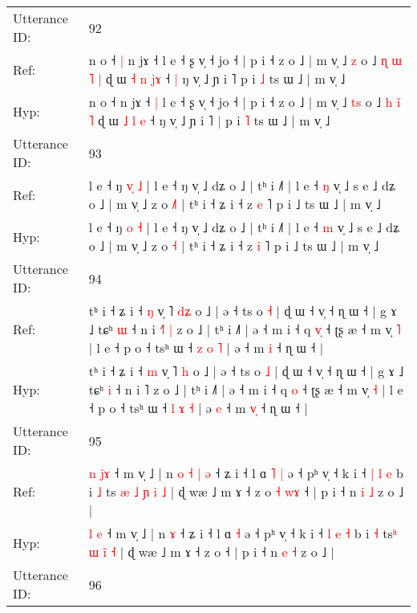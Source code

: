 \documentclass[10pt]{article}
\DeclareRobustCommand{\hl}[1]{{\textcolor{red}{#1}}}
\begin{document}
\begin{longtable}{ll}
\midrule
Utterance ID: & 92 \\
Ref: & n o ˧\hl{ }\hl{|} n jɤ ˧\hl{}\hl{} l e ˧ ʂ v̩ ˧ jo ˧ | p i ˧ z o ˩ | m v̩ ˩ \hl{}\hl{z} o ˩ \hl{ɳ} \hl{ɯ}\hl{ }\hl{˥} \hl{|} ɖ ɯ \hl{˧} \hl{n} \hl{j}\hl{ɤ} ˧\hl{ }\hl{|} ŋ v̩ ˩ ɲ i ˥\hl{}\hl{} p i \hl{˩} ts ɯ ˩ | m v̩ ˩
 \\
Hyp: & n o ˧\hl{}\hl{} n jɤ ˧\hl{ }\hl{|} l e ˧ ʂ v̩ ˧ jo ˧ | p i ˧ z o ˩ | m v̩ ˩ \hl{t}\hl{s} o ˩ \hl{h} \hl{}\hl{i}\hl{̃} \hl{˥} ɖ ɯ \hl{˩} \hl{l} \hl{}\hl{e} ˧\hl{}\hl{} ŋ v̩ ˩ ɲ i ˥\hl{ }\hl{|} p i \hl{˥} ts ɯ ˩ | m v̩ ˩
 \\
\midrule
Utterance ID: & 93 \\
Ref: & l e ˧ ŋ \hl{v}\hl{̩} \hl{˩} | l e ˧ ŋ v̩ ˩ dʑ o ˩ | tʰ i ˩˥ | l e ˧ \hl{ŋ} v̩ ˩ s e ˩ dʑ o ˩ | m v̩ ˩ z o \hl{˩}\hl{˥} | tʰ i ˧ ʑ i ˧ z \hl{e} ˥ p i ˩ ts ɯ ˩ | m v̩ ˩
 \\
Hyp: & l e ˧ ŋ \hl{}\hl{o} \hl{˧} | l e ˧ ŋ v̩ ˩ dʑ o ˩ | tʰ i ˩˥ | l e ˧ \hl{m} v̩ ˩ s e ˩ dʑ o ˩ | m v̩ ˩ z o \hl{}\hl{˧} | tʰ i ˧ ʑ i ˧ z \hl{i} ˥ p i ˩ ts ɯ ˩ | m v̩ ˩
 \\
\midrule
Utterance ID: & 94 \\
Ref: & tʰ i ˧ ʑ i ˧ \hl{ŋ} v̩ ˥ \hl{d}\hl{ʑ} o ˩ | ə ˧ ts o \hl{˧} | ɖ ɯ ˧ v̩ ˧ ɳ ɯ ˧ | g ɤ ˩ tɕʰ \hl{ɯ} ˧ n i \hl{˧}˥\hl{ }\hl{|} z o ˩ | tʰ i ˩˥ | ə ˧ m i ˧ q \hl{v}\hl{̩} ˧ ʈʂ æ ˧ m v̩ \hl{˥} | l e ˧ p o ˧ tsʰ ɯ ˧ \hl{z} \hl{o} \hl{˥} | ə\hl{}\hl{} ˧ m \hl{}\hl{i} ˧ ɳ ɯ ˧ |
 \\
Hyp: & tʰ i ˧ ʑ i ˧ \hl{m} v̩ ˥ \hl{}\hl{h} o ˩ | ə ˧ ts o \hl{˩} | ɖ ɯ ˧ v̩ ˧ ɳ ɯ ˧ | g ɤ ˩ tɕʰ \hl{i} ˧ n i \hl{}˥\hl{}\hl{} z o ˩ | tʰ i ˩˥ | ə ˧ m i ˧ q \hl{}\hl{o} ˧ ʈʂ æ ˧ m v̩ \hl{˧} | l e ˧ p o ˧ tsʰ ɯ ˧ \hl{l} \hl{ɤ} \hl{˧} | ə\hl{ }\hl{e} ˧ m \hl{v}\hl{̩} ˧ ɳ ɯ ˧ |
 \\
\midrule
Utterance ID: & 95 \\
Ref: & \hl{n} \hl{j}\hl{ɤ} ˧ m v̩ ˩ | n\hl{ }\hl{o}\hl{ }\hl{˧}\hl{ }\hl{|} \hl{ə} ˧ ʑ i ˧ l ɑ\hl{ }\hl{˥} \hl{|} ə ˧ pʰ v̩ ˧ k i ˧ \hl{|} \hl{l} \hl{e} b i \hl{˩} ts\hl{ }\hl{æ} \hl{˩} \hl{ɲ}\hl{ }\hl{i} \hl{˩} | ɖ wæ ˩ m ɤ ˧ z o\hl{ }\hl{˧}\hl{ }\hl{w}\hl{ɤ} ˧ | p i ˧ n \hl{i} \hl{˩} z o ˩ |
 \\
Hyp: & \hl{l} \hl{}\hl{e} ˧ m v̩ ˩ | n\hl{}\hl{}\hl{}\hl{}\hl{}\hl{} \hl{ɤ} ˧ ʑ i ˧ l ɑ\hl{}\hl{} \hl{˧} ə ˧ pʰ v̩ ˧ k i ˧ \hl{l} \hl{e} \hl{˧} b i \hl{˧} ts\hl{}\hl{ʰ} \hl{ɯ} \hl{}\hl{i}\hl{̃} \hl{˧} | ɖ wæ ˩ m ɤ ˧ z o\hl{}\hl{}\hl{}\hl{}\hl{} ˧ | p i ˧ n \hl{e} \hl{˧} z o ˩ |
 \\
\midrule
Utterance ID: & 96 \\

\end{longtable}
\end{document}

